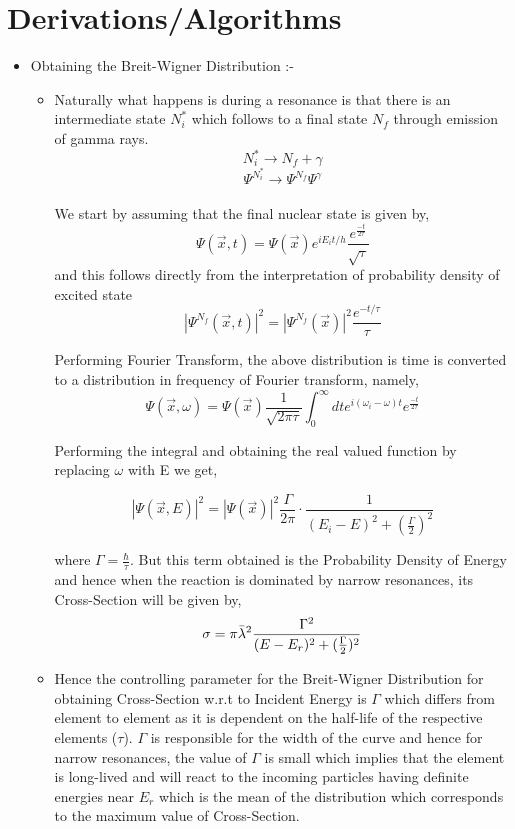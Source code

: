 \documentclass{article}
\begin{document}
\section{Derivations/Algorithms}
\begin{itemize}
    \item Obtaining the Breit-Wigner Distribution :-
    \begin{itemize}
        \item Naturally what happens is during a resonance is that there is an intermediate state $N_i^*$ which follows to a final state $N_f$ through emission of gamma rays.
        $$N_i^* \xrightarrow{} N_f + \gamma$$
        $$\Psi^{N_i^*} \xrightarrow{} \Psi^{N_f}\Psi^\gamma$$\\
        We start by assuming that the final nuclear state is given by,
        $$\Psi(\vec{x}, t) = \Psi(\vec{x})e^{iE_{i}t/h}\frac{e^\frac{-t}{2 \tau}}{\sqrt{\tau}}$$
        and this follows directly from the interpretation of probability density of excited state
        $$|\Psi^{N_f}(\vec{x},t)|^2 = |\Psi^{N_f}(\vec{x})|^2 \frac{e^{-t/\tau}}{\tau}$$
        
        Performing Fourier Transform, the above distribution is time is converted to a distribution in frequency of Fourier transform, namely,
        $$\Psi(\vec{x}, \omega) = \Psi(\vec{x})\frac{1}{\sqrt{2\pi \tau}}\int_0^\infty dt e^{i(\omega_i - \omega)t}e^\frac{-t}{2\tau}$$
        
        Performing the integral and obtaining the real valued function by replacing $\omega$ with E we get,
        
        $$|\Psi(\vec{x}, E)|^2 = |\Psi(\vec{x})|^2 \frac{\Gamma}{2\pi}\cdot\frac{1}{(E_i - E)^2 + (\frac{\Gamma}{2})^2}$$
        
        where $\Gamma = \frac{\hbar}{\tau}$. But this term obtained is the Probability Density of Energy and hence when the reaction is dominated by narrow resonances, its Cross-Section will be given by,
        $$\sigma = \pi \Bar{\lambda}^2 \frac{\Gamma^2}{(E - E_r)^2 + (\frac{\Gamma}{2})^2}$$
        
        \item Hence the controlling parameter for the Breit-Wigner Distribution for obtaining Cross-Section w.r.t to Incident Energy is $\Gamma$ which differs from element to element as it is dependent on the half-life of the respective elements ($\tau$). $\Gamma$ is responsible for the width of the curve and hence for narrow resonances, the value of $\Gamma$ is small which implies that the element is long-lived and will react to the incoming particles having definite energies near $E_r$ which is the mean of the distribution which corresponds to the maximum value of Cross-Section.
        
         
    \end{itemize}
\end{itemize}
\end{document}
